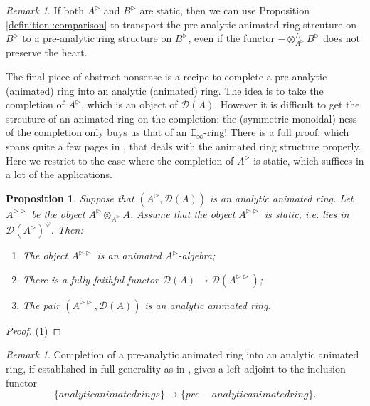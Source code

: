 \documentclass{article}
\theoremstyle{plain}
\newtheorem{prop}[thm]{Proposition}
\theoremstyle{definition}
\theoremstyle{remark}
\newtheorem{rmk}[thm]{Remark}
\newcommand{\dten}{\otimes ^{L}}
\newcommand{\huflag}{\triangleright}
\newcommand{\D}{\mathcal{D}}
\newcommand{\heart}{\heartsuit}
\begin{document}
\begin{rmk}
If both $ A ^{\huflag} $ and $ B ^{\huflag} $ are static, then we can use Proposition \ref{definition::comparison} to transport the
pre-analytic animated ring strcuture on $ B ^{\huflag} $ to a pre-analytic ring structure on $ B ^{\huflag} $,
even if the functor $ -\dten _{A ^{\huflag}}B ^{\huflag} $ does not preserve the heart.
\end{rmk}

The final piece of abstract nonsense is a recipe to complete a pre-analytic (animated) ring into an analytic (animated) ring.
The idea is to take the completion of $ A ^{\huflag} $, which is an object of $ \D (A) $.
However it is difficult to get the strcuture of an animated ring on the completion:
the (symmetric monoidal)-ness of the completion only buys us that of an $ \mathbb{E}_{\infty} $-ring!
There is a full proof, which spans quite a few pages in \cite{rodriguez-camargo_notes_nodate},
that deals with the animated ring structure properly.
Here we restrict to the case where the completion of $ A ^{\huflag} $ is static,
which suffices in a lot of the applications.
\begin{prop}
Suppose that $ (A ^{\huflag}, \D (A)) $ is an analytic animated ring.
Let $ A ^{\huflag\huflag} $ be the object $ A ^{\huflag} \otimes _{A ^{\huflag}} A $.
Assume that the object $ A ^{\huflag\huflag} $ is static, i.e. lies in $ \D (A ^{\huflag})^{\heart} $.
Then:
\begin{enumerate}
\item The object $ A ^{\huflag\huflag} $ is an animated $ A ^{\huflag} $-algebra;
\item There is a fully faithful functor $ \D (A)\to \D (A ^{\huflag\huflag}) $;
\item The pair $ (A ^{\huflag\huflag}, \D (A)) $ is an analytic animated ring.
\end{enumerate}
\end{prop}

\begin{proof}
(1)

\end{proof}

\begin{rmk}
Completion of a pre-analytic animated ring into an analytic animated ring,
if established in full generality as in \cite{rodriguez-camargo_notes_nodate},
gives a left adjoint to the inclusion functor
\begin{equation*}
\{analytic animated rings\}\to \{pre-analytic animated ring\}.
\end{equation*}
\end{rmk}
\end{document}
